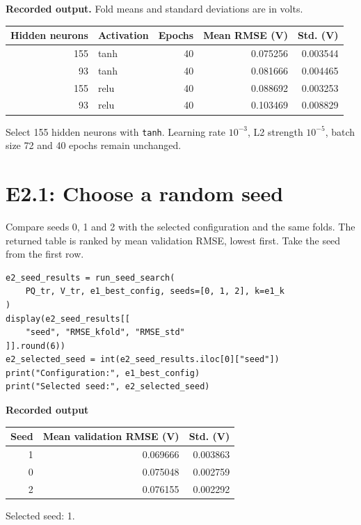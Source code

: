 \documentclass[11pt,a4paper]{article}
\begin{document}
\textbf{Recorded output.} Fold means and standard deviations are in volts.

\begin{center}
\begin{tabular}{rlrrr}
\toprule
Hidden neurons & Activation & Epochs & Mean RMSE (V) & Std. (V) \\
\midrule
155 & tanh & 40 & 0.075256 & 0.003544 \\
93 & tanh & 40 & 0.081666 & 0.004465 \\
155 & relu & 40 & 0.088692 & 0.003253 \\
93 & relu & 40 & 0.103469 & 0.008829 \\
\bottomrule
\end{tabular}
\end{center}

Select 155 hidden neurons with \texttt{tanh}. Learning rate $10^{-3}$,
L2 strength $10^{-5}$, batch size 72 and 40 epochs remain unchanged.

\clearpage
\section*{E2.1: Choose a random seed}
Compare seeds 0, 1 and 2 with the selected configuration and the same
folds. The returned table is ranked by mean validation RMSE, lowest
first. Take the seed from the first row.

\begin{lstlisting}
e2_seed_results = run_seed_search(
    PQ_tr, V_tr, e1_best_config, seeds=[0, 1, 2], k=e1_k
)
display(e2_seed_results[[
    "seed", "RMSE_kfold", "RMSE_std"
]].round(6))
e2_selected_seed = int(e2_seed_results.iloc[0]["seed"])
print("Configuration:", e1_best_config)
print("Selected seed:", e2_selected_seed)
\end{lstlisting}

\textbf{Recorded output}

\begin{center}
\begin{tabular}{rrr}
\toprule
Seed & Mean validation RMSE (V) & Std. (V) \\
\midrule
1 & 0.069666 & 0.003863 \\
0 & 0.075048 & 0.002759 \\
2 & 0.076155 & 0.002292 \\
\bottomrule
\end{tabular}
\end{center}

Selected seed: 1.
\end{document}
